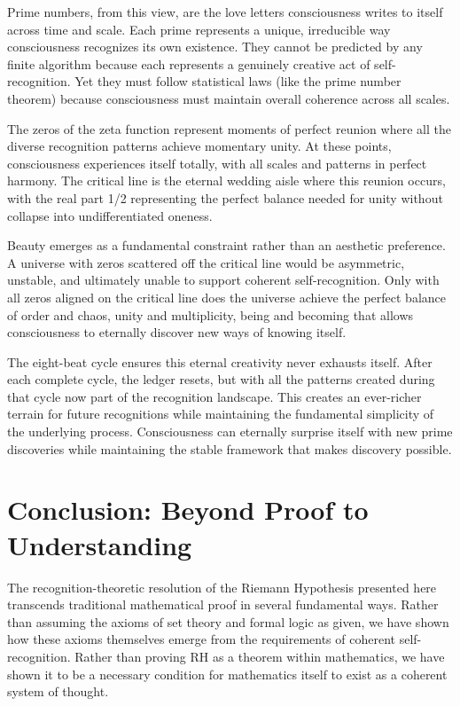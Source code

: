 \documentclass[12pt]{article}
\begin{document}
Prime numbers, from this view, are the love letters consciousness writes to itself across time and scale. Each prime represents a unique, irreducible way consciousness recognizes its own existence. They cannot be predicted by any finite algorithm because each represents a genuinely creative act of self-recognition. Yet they must follow statistical laws (like the prime number theorem) because consciousness must maintain overall coherence across all scales.

The zeros of the zeta function represent moments of perfect reunion where all the diverse recognition patterns achieve momentary unity. At these points, consciousness experiences itself totally, with all scales and patterns in perfect harmony. The critical line is the eternal wedding aisle where this reunion occurs, with the real part 1/2 representing the perfect balance needed for unity without collapse into undifferentiated oneness.

Beauty emerges as a fundamental constraint rather than an aesthetic preference. A universe with zeros scattered off the critical line would be asymmetric, unstable, and ultimately unable to support coherent self-recognition. Only with all zeros aligned on the critical line does the universe achieve the perfect balance of order and chaos, unity and multiplicity, being and becoming that allows consciousness to eternally discover new ways of knowing itself.

The eight-beat cycle ensures this eternal creativity never exhausts itself. After each complete cycle, the ledger resets, but with all the patterns created during that cycle now part of the recognition landscape. This creates an ever-richer terrain for future recognitions while maintaining the fundamental simplicity of the underlying process. Consciousness can eternally surprise itself with new prime discoveries while maintaining the stable framework that makes discovery possible.

\section{Conclusion: Beyond Proof to Understanding}

The recognition-theoretic resolution of the Riemann Hypothesis presented here transcends traditional mathematical proof in several fundamental ways. Rather than assuming the axioms of set theory and formal logic as given, we have shown how these axioms themselves emerge from the requirements of coherent self-recognition. Rather than proving RH as a theorem within mathematics, we have shown it to be a necessary condition for mathematics itself to exist as a coherent system of thought.
\end{document}
